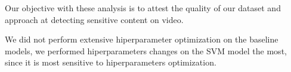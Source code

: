 

Our objective with these analysis is to attest the quality of our dataset and approach at detecting sensitive content on video.

We did not perform extensive hiperparameter optimization on the baseline models, we performed hiperparameters changes on the SVM model the most, since it is most sensitive to hiperparameters optimization.
 
